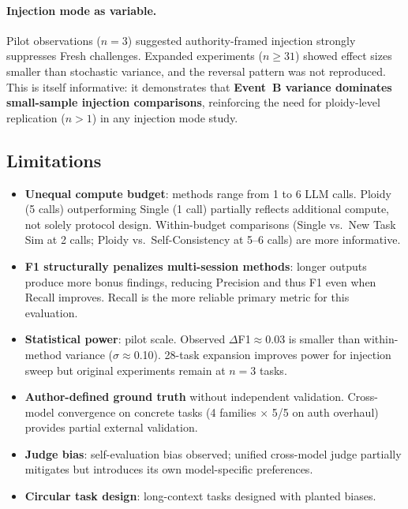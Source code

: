 \documentclass{article}
\begin{document}
\paragraph{Injection mode as variable.} Pilot observations ($n{=}3$) suggested authority-framed injection strongly suppresses Fresh challenges. Expanded experiments ($n{\geq}31$) showed effect sizes smaller than stochastic variance, and the reversal pattern was not reproduced. This is itself informative: it demonstrates that \textbf{Event~B variance dominates small-sample injection comparisons}, reinforcing the need for ploidy-level replication ($n{>}1$) in any injection mode study.

\subsection{Limitations}
\label{sec:limitations}

\begin{itemize}[leftmargin=1.5em, itemsep=1pt]
  \item \textbf{Unequal compute budget}: methods range from 1 to 6 LLM calls. Ploidy (5 calls) outperforming Single (1 call) partially reflects additional compute, not solely protocol design. Within-budget comparisons (Single vs.\ New Task Sim at 2 calls; Ploidy vs.\ Self-Consistency at 5--6 calls) are more informative.
  \item \textbf{F1 structurally penalizes multi-session methods}: longer outputs produce more bonus findings, reducing Precision and thus F1 even when Recall improves. Recall is the more reliable primary metric for this evaluation.
  \item \textbf{Statistical power}: pilot scale. Observed $\Delta$F1$\approx$0.03 is smaller than within-method variance ($\sigma\approx$0.10). 28-task expansion improves power for injection sweep but original experiments remain at $n{=}3$ tasks.
  \item \textbf{Author-defined ground truth} without independent validation. Cross-model convergence on concrete tasks (4 families $\times$ 5/5 on auth overhaul) provides partial external validation.
  \item \textbf{Judge bias}: self-evaluation bias observed; unified cross-model judge partially mitigates but introduces its own model-specific preferences.
  \item \textbf{Circular task design}: long-context tasks designed with planted biases.
\end{itemize}
\end{document}
